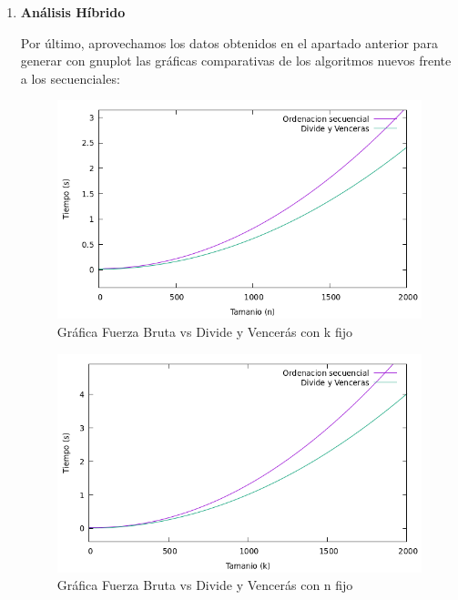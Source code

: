 \documentclass[10pt,a4paper]{article}
\begin{document}
\begin{enumerate}
  \begin{table}[h!]
  	\centering
  	\footnotesize
  \end{table}
 
\item \textbf{Análisis Híbrido}

Por último, aprovechamos los datos obtenidos en el apartado anterior para generar con gnuplot las gráficas comparativas de los algoritmos nuevos frente a los secuenciales:

\begin{figure}[h!]
	\centering
	\includegraphics[scale=0.55]{./Images/Grafica_secvsdyvk.png}
	\caption{Gráfica Fuerza Bruta vs Divide y Vencerás con k fijo}
\end{figure}

\begin{figure}[h!]
	\centering
	\includegraphics[scale=0.55]{./Images/Grafica_secvsdyvn.png}
	\caption{Gráfica Fuerza Bruta vs Divide y Vencerás con n fijo}
\end{figure}


\end{enumerate}
\end{document}
